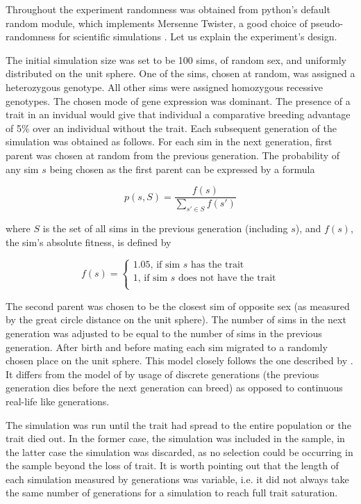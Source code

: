 \documentclass{l4proj}
\begin{document}
Throughout the experiment randomness was obtained from python's default random module, which implements Mersenne Twister, a good choice of pseudo-randomness for scientific simulations \parencite{Matsumoto98}. Let us explain the experiment's design.

The initial simulation size was set to be 100 sims, of random sex, and uniformly distributed on the unit sphere. One of the sims, chosen at random, was assigned a \gls{heterozygous} genotype. All other sims were assigned \gls{homozygous} recessive genotypes. The chosen mode of gene expression was \gls{dominant}. The presence of a trait in an invidual would give that individual a comparative breeding advantage of 5\% over an individual without the trait. Each subsequent generation of the simulation was obtained as follows. For each sim in the next generation, first parent was chosen at random from the previous generation. The probability of any sim $s$ being chosen as the first parent can be expressed by a formula

$$p(s, S) = \frac{f(s)}{\sum_{s' \in S}^{}f(s')}$$

where $S$ is the set of all sims in the previous generation (including $s$), and $f(s)$, the sim's absolute fitness, is defined by

$$
f(s) = \begin{cases}
  1.05 \text{, if sim $s$ has the trait} \\
  1 \text{, if sim $s$ does not have the trait} \\
\end{cases}
$$

The second parent was chosen to be the closest sim of opposite sex (as measured by the great circle distance on the unit sphere). The number of sims in the next generation was adjusted to be equal to the number of sims in the previous generation. After birth and before mating each sim migrated to a randomly chosen place on the unit sphere. This model closely follows the one described by \cite{peng10}. It differs from the model of \cite{rohde04} by usage of discrete generations (the previous generation dies before the next generation can breed) as opposed to continuous real-life like generations.

The simulation was run until the trait had spread to the entire population or the trait died out. In the former case, the simulation was included in the sample, in the latter case the simulation was discarded, as no selection could be occurring in the sample beyond the loss of trait. It is worth pointing out that the length of each simulation measured by generations was variable, i.e. it did not always take the same number of generations for a simulation to reach full trait saturation.
\end{document}
